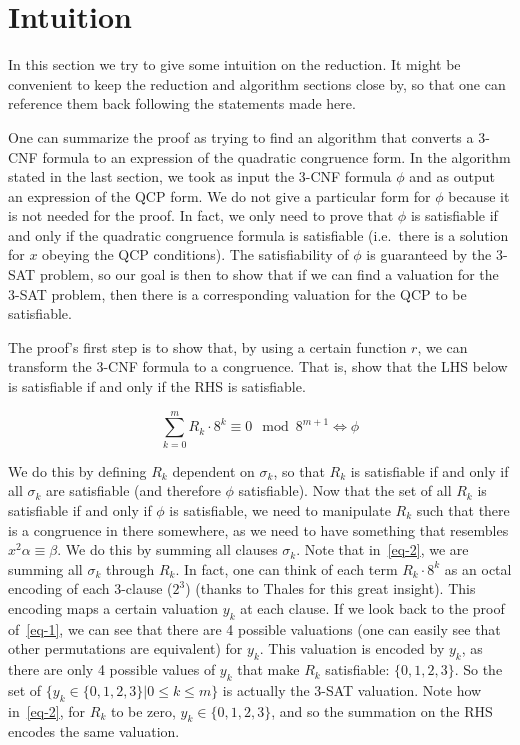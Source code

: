 \documentclass{amsart}
\theoremstyle{plain}
\begin{document}
\section{Intuition}

In this section we try to give some intuition on the reduction. It might be convenient to keep the
reduction and algorithm sections close by, so that one can reference them back following the
statements made here.

One can summarize the proof as trying to find an algorithm that converts a 3-CNF formula to an
expression of the quadratic congruence form. In the algorithm stated in the last section, we took
as input the 3-CNF formula $\phi$ and as output an expression of the QCP form. We do not give a
particular form for $\phi$ because it is not needed for the proof. In fact, we only need to prove
that $\phi$ is satisfiable if and only if the quadratic congruence formula is satisfiable (i.e.\
there is a solution for $x$ obeying the QCP conditions). The satisfiability of $\phi$ is guaranteed
by the 3-SAT problem, so our goal is then to show that if we can find a valuation for the 3-SAT
problem, then there is a corresponding valuation for the QCP to be satisfiable.

The proof's first step is to show that, by using a certain function $r$, we can transform the 3-CNF
formula to a congruence. That is, show that the LHS below is satisfiable if and only if the RHS is
satisfiable.

\begin{equation*}
  \sum_{k=0}^m R_k\cdot 8^k\equiv 0\mod 8^{m+1} \iff \phi
\end{equation*}

We do this by defining $R_k$ dependent on $\sigma_k$, so that $R_k$ is satisfiable if and only if
all $\sigma_k$ are satisfiable (and therefore $\phi$ satisfiable). Now that the set of all $R_k$ is
satisfiable if and only if $\phi$ is satisfiable, we need to manipulate $R_k$ such that there is a
congruence in there somewhere, as we need to have something that resembles $x^2\alpha\equiv\beta$.
We do this by summing all clauses $\sigma_k$. Note that in~\autoref{eq-2}, we are summing all
$\sigma_k$ through $R_k$. In fact, one can think of each term $R_k\cdot 8^k$ as an octal encoding
of each 3-clause ($2^3$) (thanks to Thales for this great insight). This encoding maps a certain
valuation $y_k$ at each clause. If we look back to the proof of~\autoref{eq-1}, we can see that
there are 4 possible valuations (one can easily see that other permutations are equivalent) for
$y_k$. This valuation is encoded by $y_k$, as there are only 4 possible values of $y_k$ that make
$R_k$ satisfiable: $\{0,1,2,3\}$. So the set of $\{y_k\in\{0,1,2,3\}|0\leq k\leq m\}$ is actually
the 3-SAT valuation.  Note how in~\autoref{eq-2}, for $R_k$ to be zero, $y_k\in\{0,1,2,3\}$, and so
the summation on the RHS encodes the same valuation.
\end{document}
